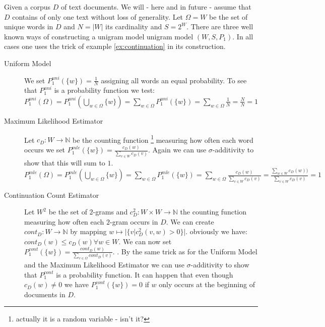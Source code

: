 \documentclass[•]{book}
\begin{document}
\begin{example}\label{ex:unigram-model}
Given a corpus $D$ of text documents. We will - here and in future - assume that $D$ contains of only one text without loss of generality.  Let $\Omega=W$ be the set of unique words in $D$ and $N = |W|$ its cardinality and $S=2^{W}$. There are three well known ways of constructing a unigram model unigram model $(W,S,P_1)$. In all cases one uses the trick of example \ref{ex:continuation} in its construction. 
\begin{description}
\item[Uniform Model] We set $P_1^{uni}(\{w\})=\frac{1}{N}$ assigning all words an equal probability. To see that  $P_1^{uni}$ is a probability function we test: $P_1^{uni}(\Omega) = P_1^{uni}(\bigcup_{w\in\Omega}\{w\}) = \sum_{w\in\Omega}P_1^{uni}(\{w\}) = \sum_{w\in\Omega}\frac{1}{N} = \frac{N}{N} = 1 $ 
\item[Maximum Likelihood Estimator]  Let $c_D:W\longrightarrow\mathbb{N}$ be  the counting function \footnote{actually it is a random variable - isn't it?} measuring  how often each word occurs we set $P_1^{mle}(\{w\})=\frac{c_D(w)}{\sum_{v\in W}c_D(v)}$. Again we can use $\sigma$-additivity to show that this will sum to $1$. $P_1^{mle}(\Omega) = P_1^{mle}(\bigcup_{w\in\Omega}\{w\}) = \sum_{w\in\Omega}P_1^{mle}(\{w\} ) =  \sum_{w\in\Omega} \frac{c_D(w)}{\sum_{v\in W}c_D(v)} = \frac{\sum_{w\in W}c_D(w))}{\sum_{v\in W}c_D(v)} = 1$ 
\item[Continuation Count Estimator] Let $W^2$ be the set of $2$-grams and $c_D^2:W\times W\longrightarrow \mathbb{N}$ the counting function measuring how often each $2$-gram occurs in $D$. We can create $cont_D:W\longrightarrow\mathbb{N}$ by mapping $w\mapsto |\{v| c_D^2(v,w) > 0\}|$. obviously we have: $cont_D(w) \leq c_D(w) \forall w\in W$. We can now set $P_1^{cont}(\{w\}) = \frac{cont_D(w)}{\sum_{v\in\Omega}cont_D(v)}$. . By the same trick as for the Uniform Model and the Maximum Likelihood Estimator we can use $\sigma$-additivity to show that $P_1^{cont}$ is a probability function. It can happen that even though $c_D(w) \neq 0$ we have $P_1^{cont}(\{w\}) = 0$ if $w$ only occurs at the beginning of documents in $D$. 
\end{description}
\end{example}
\end{document}
